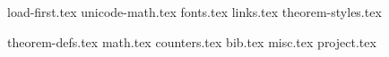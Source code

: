 
{load-first.tex}
{unicode-math.tex}
{fonts.tex}
{links.tex}
{theorem-styles.tex}
\theoremstyle{rmnl}
{theorem-defs.tex}
{math.tex}
{counters.tex}
{bib.tex}
{misc.tex}
{project.tex}
